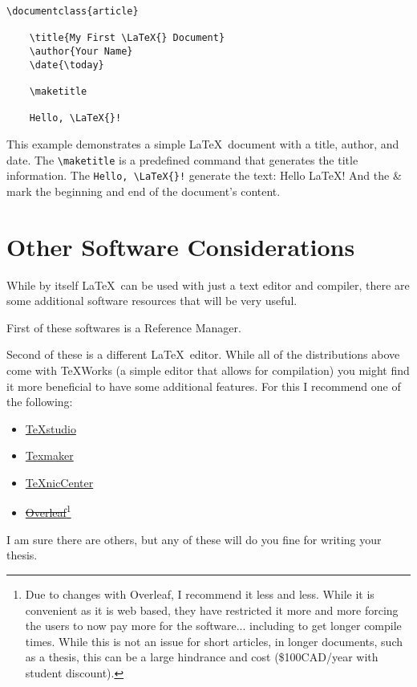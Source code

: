 		\begin{lstlisting}[style=LaTeXStyle]
\documentclass{article}

    \title{My First \LaTeX{} Document}
    \author{Your Name}
    \date{\today}
    
    \maketitle
    
    Hello, \LaTeX{}!

		\end{lstlisting}
		This example demonstrates a simple \LaTeX\ document with a title, author, and date. 
		The \lstinline|\maketitle| is a predefined command that generates the title information.
		The \lstinline|Hello, \LaTeX{}!| generate the text: Hello \LaTeX!
		And the \lstinline|| \&\ \lstinline|| mark the beginning and end of the document's content.

	\section{Other Software Considerations}
		While by itself \LaTeX\ can be used with just a text editor and compiler, there are some additional software resources that will be very useful.
		
		First of these softwares is a Reference Manager.
		
		
		Second of these is a different \LaTeX\ editor.
		While all of the distributions above come with TeXWorks (a simple editor that allows for compilation) you might find it more beneficial to have some additional features.
		For this I recommend one of the following:
		\begin{itemize}
			\item \href{https://www.texstudio.org/}{TeXstudio}
			\item \href{http://www.xm1math.net/texmaker/}{Texmaker}
			\item \href{http://www.texniccenter.org/}{TeXnicCenter}
			\item \href{https://www.overleaf.com/}{\sout{Overleaf}}\footnote{Due to changes with Overleaf, I recommend it less and less. While it is convenient as it is web based, they have restricted it more and more forcing the users to now pay more for the software... including to get longer compile times. While this is not an issue for short articles, in longer documents, such as a thesis, this can be a large hindrance and cost (\$100CAD/year with student discount).}
		\end{itemize}
		I am sure there are others, but any of these will do you fine for writing your thesis.